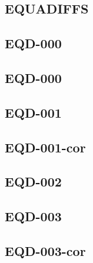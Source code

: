 \begin{multicols}{2}

\section*{EQUADIFFS}
\newcommand{\xxexo}{EQD-000}
\subsection*{\xxexo}
\graphicspath{{../../exos/equadiffs/\xxexo/}}


\newcommand{\xxexo}{EQD-000-cor}
\subsection*{\xxexo}
\graphicspath{{../../exos/equadiffs/\xxexo/}}


\renewcommand{\xxexo}{EQD-001}
\subsection*{\xxexo}
\graphicspath{{../../exos/equadiffs/\xxexo/}}


\renewcommand{\xxexo}{EQD-001-cor}
\subsection*{\xxexo}
\graphicspath{{../../exos/equadiffs/\xxexo/}}


\renewcommand{\xxexo}{EQD-002}
\subsection*{\xxexo}
\graphicspath{{../../exos/equadiffs/\xxexo/}}


\renewcommand{\xxexo}{EQD-003}
\subsection*{\xxexo}
\graphicspath{{../../exos/equadiffs/\xxexo/}}


\renewcommand{\xxexo}{EQD-003-cor}
\subsection*{\xxexo}
\graphicspath{{../../exos/equadiffs/\xxexo/}}



\end{multicols}

